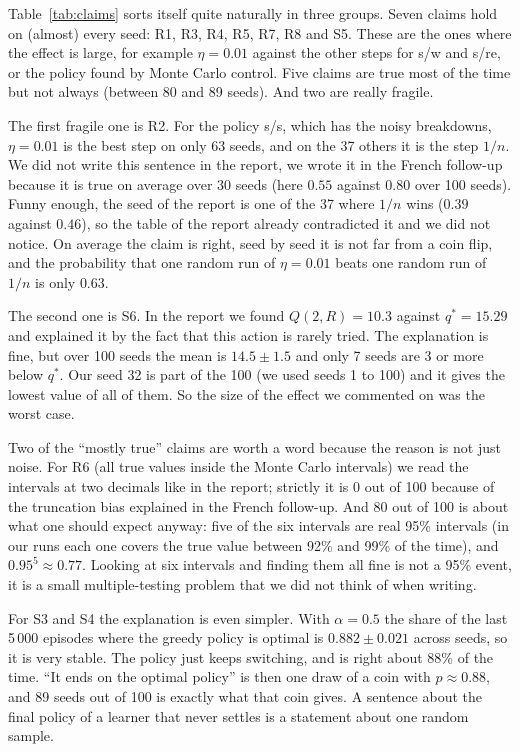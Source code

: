 Table~\ref{tab:claims} sorts itself quite naturally in three groups. Seven claims hold on (almost) every seed: R1, R3, R4, R5, R7, R8 and S5. These are the ones where the effect is large, for example $\eta = 0.01$ against the other steps for s/w and s/re, or the policy found by Monte Carlo control. Five claims are true most of the time but not always (between 80 and 89 seeds). And two are really fragile.

The first fragile one is R2. For the policy s/s, which has the noisy breakdowns, $\eta = 0.01$ is the best step on only 63 seeds, and on the 37 others it is the step $1/n$. We did not write this sentence in the report, we wrote it in the French follow-up because it is true on average over 30 seeds (here $0.55$ against $0.80$ over 100 seeds). Funny enough, the seed of the report is one of the 37 where $1/n$ wins ($0.39$ against $0.46$), so the table of the report already contradicted it and we did not notice. On average the claim is right, seed by seed it is not far from a coin flip, and the probability that one random run of $\eta = 0.01$ beats one random run of $1/n$ is only $0.63$.

The second one is S6. In the report we found $Q(2, R) = 10.3$ against $q^* = 15.29$ and explained it by the fact that this action is rarely tried. The explanation is fine, but over 100 seeds the mean is $14.5 \pm 1.5$ and only 7 seeds are 3 or more below $q^*$. Our seed 32 is part of the 100 (we used seeds 1 to 100) and it gives the lowest value of all of them. So the size of the effect we commented on was the worst case.

Two of the ``mostly true'' claims are worth a word because the reason is not just noise. For R6 (all true values inside the Monte Carlo intervals) we read the intervals at two decimals like in the report; strictly it is 0 out of 100 because of the truncation bias explained in the French follow-up. And 80 out of 100 is about what one should expect anyway: five of the six intervals are real 95\% intervals (in our runs each one covers the true value between 92\% and 99\% of the time), and $0.95^5 \approx 0.77$. Looking at six intervals and finding them all fine is not a 95\% event, it is a small multiple-testing problem that we did not think of when writing.

For S3 and S4 the explanation is even simpler. With $\alpha = 0.5$ the share of the last 5\,000 episodes where the greedy policy is optimal is $0.882 \pm 0.021$ across seeds, so it is very stable. The policy just keeps switching, and is right about 88\% of the time. ``It ends on the optimal policy'' is then one draw of a coin with $p \approx 0.88$, and 89 seeds out of 100 is exactly what that coin gives. A sentence about the final policy of a learner that never settles is a statement about one random sample.

